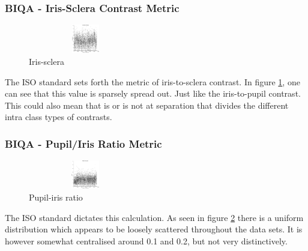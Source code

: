 \subsubsection{BIQA - Iris-Sclera Contrast Metric}\vspace{-5mm}
	\begin{figure}
		\centering
		\includegraphics[height=1.25cm, width=5cm]{pics/biqa_dist_isc}
		\caption{Iris-sclera \cite{iso}}
		\label{fig:isc}
	\end{figure}
The ISO standard sets forth the metric of iris-to-sclera contrast. In figure
\ref{fig:isc}, one can see that this value is sparsely spread out. Just like the
iris-to-pupil contrast.  This could also  mean that is or is not at separation
that divides the different intra class types of contrasts.


\vspace{-5mm}
\subsubsection{BIQA - Pupil/Iris Ratio Metric}\vspace{-5mm}
	\begin{figure}
		\centering
		\includegraphics[height=1.25cm, width=5cm]{pics/biqa_dist_pup_ir_ratio}
		\caption{Pupil-iris ratio \cite{iso}}
		\label{fig:pir}
	\end{figure}
The ISO standard dictates this calculation.  As seen in figure \ref{fig:pir} 
there is a uniform distribution which appears to be loosely scattered throughout
the data sets.  It is however somewhat centralised around 0.1 and 0.2, but not
very distinctively.


\vspace{-5mm}
